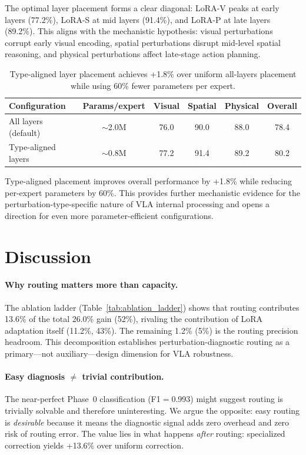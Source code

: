 \documentclass[conference]{article}
\begin{document}
The optimal layer placement forms a clear diagonal: LoRA-V peaks at early layers (77.2\%), LoRA-S at mid layers (91.4\%), and LoRA-P at late layers (89.2\%).
This aligns with the mechanistic hypothesis: visual perturbations corrupt early visual encoding, spatial perturbations disrupt mid-level spatial reasoning, and physical perturbations affect late-stage action planning.

\begin{table}[h]
\centering
\caption{Type-aligned layer placement achieves +1.8\% over uniform all-layers placement while using 60\% fewer parameters per expert.}
\label{tab:layer_system}
\small
\begin{tabular}{lccccc}
\toprule
Configuration & Params/expert & Visual & Spatial & Physical & Overall \\
\midrule
All layers (default) & $\sim$2.0M & 76.0 & 90.0 & 88.0 & 78.4 \\
Type-aligned layers & $\sim$0.8M & 77.2 & 91.4 & 89.2 & 80.2 \\
\bottomrule
\end{tabular}
\end{table}

Type-aligned placement improves overall performance by +1.8\% while reducing per-expert parameters by 60\%.
This provides further mechanistic evidence for the perturbation-type-specific nature of VLA internal processing and opens a direction for even more parameter-efficient configurations.

\section{Discussion}

\paragraph{Why routing matters more than capacity.}
The ablation ladder (Table~\ref{tab:ablation_ladder}) shows that routing contributes 13.6\% of the total 26.0\% gain (52\%), rivaling the contribution of LoRA adaptation itself (11.2\%, 43\%).
The remaining 1.2\% (5\%) is the routing precision headroom.
This decomposition establishes perturbation-diagnostic routing as a primary---not auxiliary---design dimension for VLA robustness.

\paragraph{Easy diagnosis $\neq$ trivial contribution.}
The near-perfect Phase~0 classification (F1$=$0.993) might suggest routing is trivially solvable and therefore uninteresting.
We argue the opposite: easy routing is \emph{desirable} because it means the diagnostic signal adds zero overhead and zero risk of routing error.
The value lies in what happens \emph{after} routing: specialized correction yields +13.6\% over uniform correction.
\end{document}
